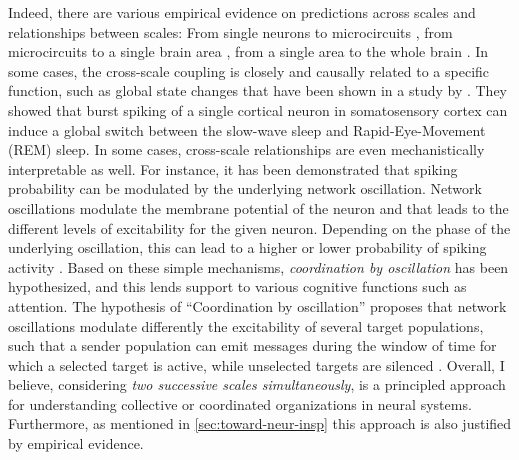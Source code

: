 Indeed, there are various empirical evidence on predictions across scales and relationships between scales:
From single neurons to microcircuits \cite{raschInferringSpikeTrains2008a,raschNeuronsCircuitsLinear2009},
from microcircuits to a single brain area \cite{liBurstSpikingSingle2009a},
from a single area to the whole brain \cite{schwalmCortexwideBOLDFMRI2017,zerbiRapidReconfigurationFunctional2019}.
In some cases, the cross-scale coupling is closely and causally related to a specific function,
such as global state changes that have been shown in a study by \citet{liBurstSpikingSingle2009a}.
They showed that burst spiking of a single
cortical neuron in somatosensory cortex can induce a global switch between the slow-wave sleep and Rapid-Eye-Movement (REM) sleep.
In some cases, cross-scale relationships are even mechanistically interpretable as well.
For instance, it has been demonstrated that spiking probability can be modulated by the underlying network oscillation.
Network oscillations modulate the membrane potential of the neuron and that leads to the different levels of excitability for the given neuron.
Depending on the phase of the underlying oscillation, this can lead to a higher or lower probability of spiking activity \cite{volgushevLongrangeCorrelationMembrane2011,hasenstaubInhibitoryPostsynapticPotentials2005}.
Based on these simple mechanisms, \emph{coordination by oscillation} has been hypothesized,
and this lends support to various cognitive functions such as attention. 
The hypothesis of ``Coordination by oscillation'' proposes that network
oscillations modulate differently the excitability of several target populations,
such that a sender population can emit messages during the window of time for which a selected target is active, 
while unselected targets are silenced
\citep{friesRhythmsCognitionCommunication2015,womelsdorfModulationNeuronalInteractions2007a,friesMechanismCognitiveDynamics2005}.
Overall, I believe, considering \emph{two successive scales simultaneously},
is a principled approach for understanding collective or coordinated organizations in neural systems.
Furthermore, as mentioned in  \autoref{sec:toward-neur-insp} this approach is also justified by empirical evidence.


